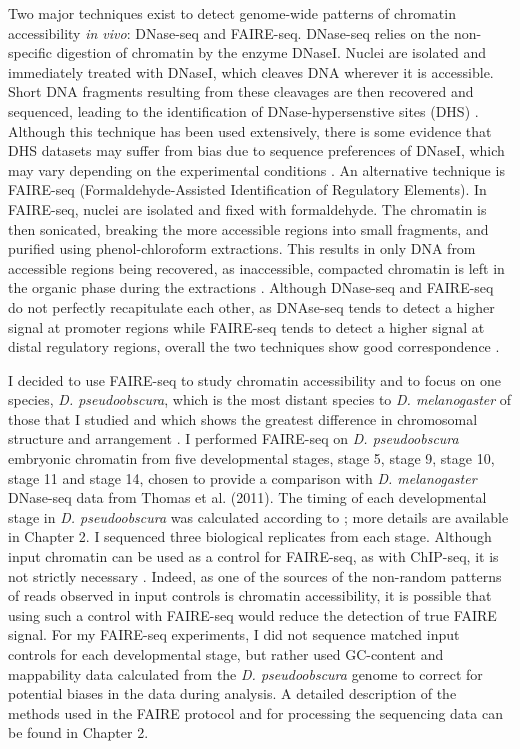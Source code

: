 Two major techniques exist to detect genome-wide patterns of chromatin accessibility \emph{in vivo}: DNase-seq and FAIRE-seq. DNase-seq relies on the non-specific digestion of chromatin by the enzyme DNaseI. Nuclei are isolated and immediately treated with DNaseI, which cleaves DNA wherever it is accessible. Short DNA fragments resulting from these cleavages are then recovered and sequenced, leading to the identification of DNase-hypersenstive sites (DHS) \citep{thomas_dynamic_2011}. Although this technique has been used extensively, there is some evidence that DHS datasets may suffer from bias due to sequence preferences of DNaseI, which may vary depending on the experimental conditions \citep{koohy_chromatin_2013}. An alternative technique is FAIRE-seq (Formaldehyde-Assisted Identification of Regulatory Elements). In FAIRE-seq, nuclei are isolated and fixed with formaldehyde. The chromatin is then sonicated, breaking the more accessible regions into small fragments, and purified using phenol-chloroform extractions. This results in only DNA from accessible regions being recovered, as inaccessible, compacted chromatin is left in the organic phase during the extractions \citep{giresi_isolation_2009, simon_using_2012}. Although DNase-seq and FAIRE-seq do not perfectly recapitulate each other, as DNAse-seq tends to detect a higher signal at promoter regions while FAIRE-seq tends to detect a higher signal at distal regulatory regions, overall the two techniques show good correspondence \citep{koohy_chromatin_2013, mckay_common_2013}.
   
I decided to use FAIRE-seq to study chromatin accessibility and to focus on one species, \emph{D. pseudoobscura}, which is the most distant species to \emph{D. melanogaster} of those that I studied and which shows the greatest difference in chromosomal structure and arrangement \citep{clark_evolution_2007,richards_comparative_2005}. I performed FAIRE-seq on \emph{D. pseudoobscura} embryonic chromatin from five developmental stages, stage 5, stage 9, stage 10, stage 11 and stage 14, chosen to provide a comparison with \emph{D. melanogaster} DNase-seq data from Thomas et al. (2011). The timing of each developmental stage in \emph{D. pseudoobscura} was calculated according to \citet{kuntz_native_2013}; more details are available in Chapter 2. I sequenced three biological replicates from each stage. Although input chromatin can be used as a control for FAIRE-seq, as with ChIP-seq, it is not strictly necessary \citep{simon_using_2012}. Indeed, as one of the sources of the non-random patterns of reads observed in input controls is chromatin accessibility, it is possible that using such a control with FAIRE-seq would reduce the detection of true FAIRE signal. For my FAIRE-seq experiments, I did not sequence matched input controls for each developmental stage, but rather used GC-content and mappability data calculated from the \emph{D. pseudoobscura} genome to correct for potential biases in the data during analysis. A detailed description of the methods used in the FAIRE protocol and for processing the sequencing data can be found in Chapter 2.


